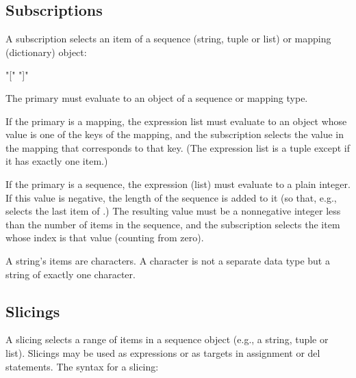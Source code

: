 \subsection{Subscriptions\label{subscriptions}}

A subscription selects an item of a sequence (string, tuple or list)
or mapping (dictionary) object:

\begin{productionlist}
             { "["  "]"}
\end{productionlist}

The primary must evaluate to an object of a sequence or mapping type.

If the primary is a mapping, the expression list must evaluate to an
object whose value is one of the keys of the mapping, and the
subscription selects the value in the mapping that corresponds to that
key.  (The expression list is a tuple except if it has exactly one
item.)

If the primary is a sequence, the expression (list) must evaluate to a
plain integer.  If this value is negative, the length of the sequence
is added to it (so that, e.g.,  selects the last item of
.)  The resulting value must be a nonnegative integer less
than the number of items in the sequence, and the subscription selects
the item whose index is that value (counting from zero).

A string's items are characters.  A character is not a separate data
type but a string of exactly one character.


\subsection{Slicings\label{slicings}}

A slicing selects a range of items in a sequence object (e.g., a
string, tuple or list).  Slicings may be used as expressions or as
targets in assignment or del statements.  The syntax for a slicing:

